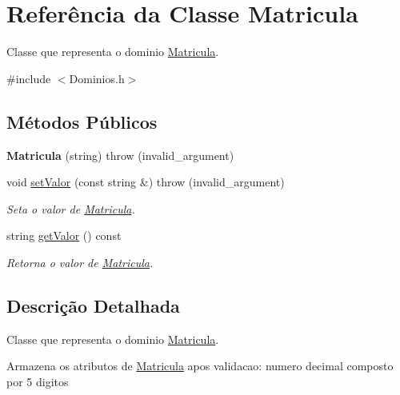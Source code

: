\hypertarget{class_matricula}{
\section{\-Referência da \-Classe \-Matricula}
\label{class_matricula}
}


\-Classe que representa o dominio \hyperlink{class_matricula}{\-Matricula}.  




{\ttfamily \#include $<$\-Dominios.\-h$>$}

\subsection*{\-Métodos \-Públicos}
\begin{DoxyCompactItemize}
\item 
\hypertarget{class_matricula_ad0e207a892bf8ae631a9374d9998996c}{
{\bfseries \-Matricula} (string)  throw (invalid\-\_\-argument)}
\label{class_matricula_ad0e207a892bf8ae631a9374d9998996c}

\item 
void \hyperlink{class_matricula_a0b767fcc96039728967640a19683aecd}{set\-Valor} (const string \&)  throw (invalid\-\_\-argument)
\begin{DoxyCompactList}\small\item\em \-Seta o valor de \hyperlink{class_matricula}{\-Matricula}. \end{DoxyCompactList}\item 
string \hyperlink{class_matricula_a5be68782efe39d296add81af1f4a8cc2}{get\-Valor} () const 
\begin{DoxyCompactList}\small\item\em \-Retorna o valor de \hyperlink{class_matricula}{\-Matricula}. \end{DoxyCompactList}\end{DoxyCompactItemize}


\subsection{\-Descrição \-Detalhada}
\-Classe que representa o dominio \hyperlink{class_matricula}{\-Matricula}. 

\-Armazena os atributos de \hyperlink{class_matricula}{\-Matricula} apos validacao\-: numero decimal composto por 5 digitos 

